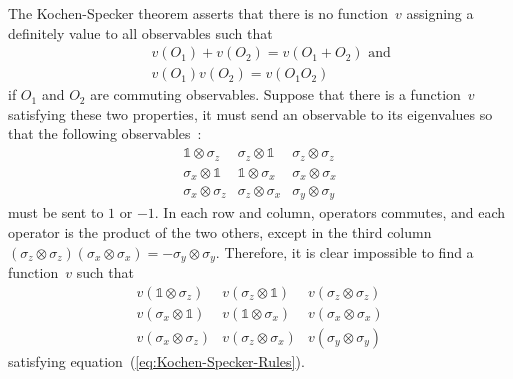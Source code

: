 \documentclass[reprint, aps, prl,superscriptaddress, showpacs,
showkeys]{revtex4-1}
\theoremstyle{plain}
\theoremstyle{definition}
\begin{document}
The Kochen-Specker theorem asserts that there is no function~$v$
assigning a definitely value to all observables such that 
\begin{eqnarray}
 &  & v\left(O_{1}\right)+v\left(O_{2}\right)=v\left(O_{1}+O_{2}\right)\textrm{ and}\\
 &  & v\left(O_{1}\right)v\left(O_{2}\right)=v\left(O_{1}O_{2}\right)\label{eq:Kochen-Specker-Rules}
\end{eqnarray}
if $O_{1}$ and $O_{2}$ are commuting observables. Suppose that there
is a function~$v$ satisfying these two properties, it must send
an observable to its eigenvalues so that the following observables~\citep{Mermin1990Simple,peres1995quantum}:
\begin{equation}
\begin{array}{ccc}
\mathbb{1}\otimes\sigma_{z} & \sigma_{z}\otimes\mathbb{1} & \sigma_{z}\otimes\sigma_{z}\\
\sigma_{x}\otimes\mathbb{1} & \mathbb{1}\otimes\sigma_{x} & \sigma_{x}\otimes\sigma_{x}\\
\sigma_{x}\otimes\sigma_{z} & \sigma_{z}\otimes\sigma_{x} & \sigma_{y}\otimes\sigma_{y}
\end{array}\label{eq:MerminSquare}
\end{equation}
must be sent to $1$ or $-1$. In each row and column, operators commutes,
and each operator is the product of the two others, except in the
third column $\left(\sigma_{z}\otimes\sigma_{z}\right)\left(\sigma_{x}\otimes\sigma_{x}\right)=-\sigma_{y}\otimes\sigma_{y}$.
Therefore, it is clear impossible to find a function~$v$ such that
\begin{equation}
\begin{array}{ccc}
v\left(\mathbb{1}\otimes\sigma_{z}\right) & v\left(\sigma_{z}\otimes\mathbb{1}\right) & v\left(\sigma_{z}\otimes\sigma_{z}\right)\\
v\left(\sigma_{x}\otimes\mathbb{1}\right) & v\left(\mathbb{1}\otimes\sigma_{x}\right) & v\left(\sigma_{x}\otimes\sigma_{x}\right)\\
v\left(\sigma_{x}\otimes\sigma_{z}\right) & v\left(\sigma_{z}\otimes\sigma_{x}\right) & v\left(\sigma_{y}\otimes\sigma_{y}\right)
\end{array}\label{eq:MerminSquare-values}
\end{equation}
satisfying equation~(\ref{eq:Kochen-Specker-Rules}).
\end{document}
